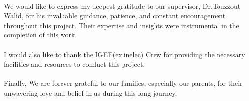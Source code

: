 \begin{Acknowledgments}

                              






\paragraph{}
We would like to express my deepest gratitude to our supervisor, Dr.Touzzout Walid, for his invaluable guidance, patience, and constant encouragement throughout this project. Their expertise and insights were instrumental in the completion of this work.
\paragraph{}
I would also like to thank the IGEE(ex.inelec) Crew for providing the necessary facilities and resources to conduct this project.
\paragraph{}
Finally, We are forever grateful to our families, especially our parents, for their unwavering love and belief in us during this long journey.
\paragraph{}

\end{Acknowledgments}